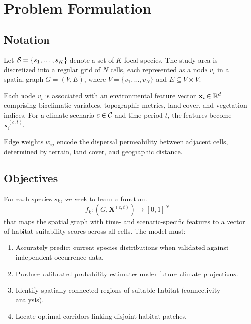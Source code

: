 \section{Problem Formulation}

\label{sec:problem}

\subsection{Notation}

Let $\mathcal{S} = \{s_1, \ldots, s_K\}$ denote a set of $K$ focal species.
The study area is discretized into a regular grid of $N$ cells, each
represented as a node $v_i$ in a spatial graph $G = (V, E)$, where $V =
\{v_1, \ldots, v_N\}$ and $E \subseteq V \times V$.

Each node $v_i$ is associated with an environmental feature vector
$\mathbf{x}_i \in \mathbb{R}^d$ comprising bioclimatic variables, topographic
metrics, land cover, and vegetation indices. For a climate scenario $c
\in \mathcal{C}$ and time period $t$, the features become
$\mathbf{x}_i^{(c,t)}$.

Edge weights $w_{ij}$ encode the dispersal permeability between adjacent
cells, determined by terrain, land cover, and geographic distance.

\subsection{Objectives}

For each species $s_k$, we seek to learn a function:
\begin{equation}
  f_k: (G, \mathbf{X}^{(c,t)}) \rightarrow [0,1]^N
\end{equation}
that maps the spatial graph with time- and scenario-specific features to
a vector of habitat suitability scores across all cells. The model must:

\begin{enumerate}
  \item Accurately predict current species distributions when validated
    against independent occurrence data.
  \item Produce calibrated probability estimates under future climate
    projections.
  \item Identify spatially connected regions of suitable habitat
    (connectivity analysis).
  \item Locate optimal corridors linking disjoint habitat patches.
\end{enumerate}

